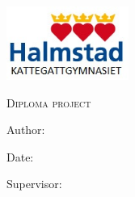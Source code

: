 \documentclass[../main.tex]{subfiles}
\begin{document}
\begin{titlepage}
    \includegraphics[width=0.3\textwidth]{logo.png}\par
    \vspace{0.5cm}
	{\scshape\LARGE Diploma project\par}
	\vspace{0.2cm}
    {\Large Author: \@author\par}
    {\Large Date: \@date\par}
    {\Large Supervisor: \@supervisor\par}

	\centering
    \vspace{\fill}

    {\Huge\@title\par}
    \vspace{0.2cm}
    {\Large\bfseries\@subtitle\par}

    \vspace{\fill}
    \vspace{\fill}
\end{titlepage}
\end{document}
